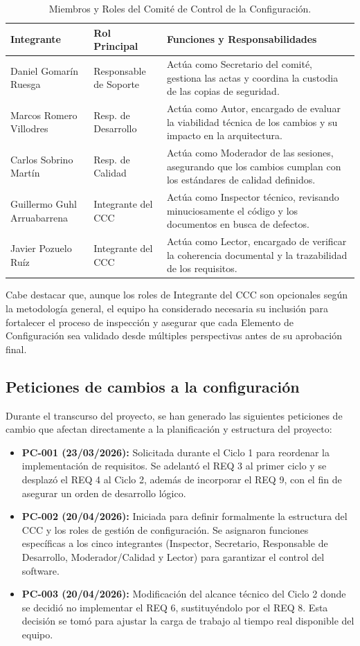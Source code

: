 \documentclass[11pt,a4paper]{article}
\begin{document}
\begin{table}[H]
\centering
\small
\begin{tabularx}{\textwidth}{@{}l l L@{}}
\toprule
\textbf{Integrante} & \textbf{Rol Principal} & \textbf{Funciones y Responsabilidades} \\ \midrule
Daniel Gomarín Ruesga & Responsable de Soporte & Actúa como Secretario del comité, gestiona las actas y coordina la custodia de las copias de seguridad. \\
Marcos Romero Villodres & Resp. de Desarrollo & Actúa como Autor, encargado de evaluar la viabilidad técnica de los cambios y su impacto en la arquitectura. \\
Carlos Sobrino Martín & Resp. de Calidad & Actúa como Moderador de las sesiones, asegurando que los cambios cumplan con los estándares de calidad definidos. \\
Guillermo Guhl Arruabarrena & Integrante del CCC & Actúa como Inspector técnico, revisando minuciosamente el código y los documentos en busca de defectos. \\
Javier Pozuelo Ruíz & Integrante del CCC & Actúa como Lector, encargado de verificar la coherencia documental y la trazabilidad de los requisitos. \\
\bottomrule
\end{tabularx}
\caption{Miembros y Roles del Comité de Control de la Configuración.}
\end{table}

Cabe destacar que, aunque los roles de Integrante del CCC son opcionales según la metodología general, el equipo ha considerado necesaria su inclusión para fortalecer el proceso de inspección y asegurar que cada Elemento de Configuración sea validado desde múltiples perspectivas antes de su aprobación final.

\subsection{Peticiones de cambios a la configuración}
Durante el transcurso del proyecto, se han generado las siguientes peticiones de cambio que afectan directamente a la planificación y estructura del proyecto:\begin{itemize}
    \item \textbf{PC-001 (23/03/2026):} Solicitada durante el Ciclo 1 para reordenar la implementación de requisitos. Se adelantó el REQ 3 al primer ciclo y se desplazó el REQ 4 al Ciclo 2, además de incorporar el REQ 9, con el fin de asegurar un orden de desarrollo lógico.
    \item \textbf{PC-002 (20/04/2026):} Iniciada para definir formalmente la estructura del CCC y los roles de gestión de configuración. Se asignaron funciones específicas a los cinco integrantes (Inspector, Secretario, Responsable de Desarrollo, Moderador/Calidad y Lector) para garantizar el control del software.
    \item \textbf{PC-003 (20/04/2026):} Modificación del alcance técnico del Ciclo 2 donde se decidió no implementar el REQ 6, sustituyéndolo por el REQ 8. Esta decisión se tomó para ajustar la carga de trabajo al tiempo real disponible del equipo.
\end{itemize}  
\end{document}
